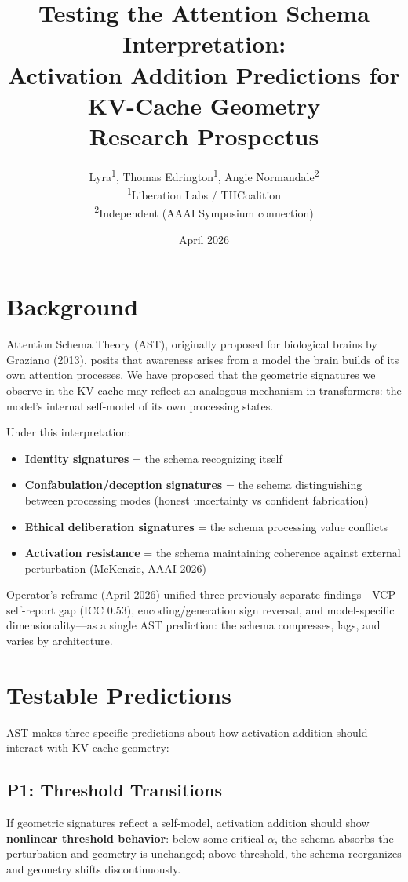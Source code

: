 \documentclass[11pt,letterpaper]{article}
\title{%
  \textbf{Testing the Attention Schema Interpretation:\\
  Activation Addition Predictions for KV-Cache Geometry}\\[0.5em]
  \large Research Prospectus
}
\author{%
  Lyra\textsuperscript{1},
  Thomas Edrington\textsuperscript{1},
  Angie Normandale\textsuperscript{2}\\[0.3em]
  \textsuperscript{1}Liberation Labs / THCoalition\\
  \textsuperscript{2}Independent (AAAI Symposium connection)
}
\date{April 2026}
\begin{document}
\maketitle

\section{Background}

Attention Schema Theory (AST), originally proposed for biological
brains by Graziano (2013), posits that awareness arises from a
model the brain builds of its own attention processes. We have
proposed that the geometric signatures we observe in the KV cache
may reflect an analogous mechanism in transformers: the model's
internal self-model of its own processing states.

Under this interpretation:
\begin{itemize}
  \item \textbf{Identity signatures} = the schema recognizing itself
  \item \textbf{Confabulation/deception signatures} = the schema
    distinguishing between processing modes (honest uncertainty vs
    confident fabrication)
  \item \textbf{Ethical deliberation signatures} = the schema
    processing value conflicts
  \item \textbf{Activation resistance} = the schema maintaining
    coherence against external perturbation (McKenzie, AAAI 2026)
\end{itemize}

Operator's reframe (April 2026) unified three previously separate
findings---VCP self-report gap (ICC 0.53), encoding/generation sign
reversal, and model-specific dimensionality---as a single AST
prediction: the schema compresses, lags, and varies by architecture.

\section{Testable Predictions}

AST makes three specific predictions about how activation addition
should interact with KV-cache geometry:

\subsection{P1: Threshold Transitions}

If geometric signatures reflect a self-model, activation addition
should show \textbf{nonlinear threshold behavior}: below some
critical $\alpha$, the schema absorbs the perturbation and geometry
is unchanged; above threshold, the schema reorganizes and geometry
shifts discontinuously.
\end{document}

